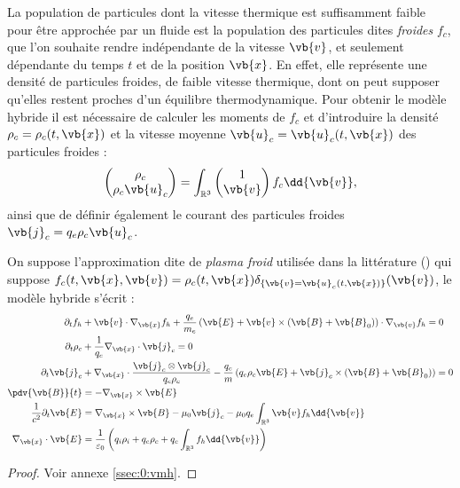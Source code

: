 La population de particules dont la vitesse thermique est suffisamment faible pour être approchée par un fluide est la population des particules dites \emph{froides} $f_c$, que l'on souhaite rendre indépendante de la vitesse $\vb{v}$, et seulement dépendante du temps $t$ et de la position $\vb{x}$. En effet, elle représente une densité de particules froides, de faible vitesse thermique, dont on peut supposer qu'elles restent proches d'un équilibre thermodynamique. Pour obtenir le modèle hybride il est nécessaire de calculer les moments de $f_c$ et d'introduire la densité $\rho_c=\rho_c(t,\vb{x})$ et la vitesse moyenne $\vb{u}_c=\vb{u}_c(t,\vb{x})$ des particules froides :
$$
  \begin{pmatrix}
    \rho_c \\
    \rho_c \vb{u}_c
  \end{pmatrix}
  =
  \int_{\mathbb{R}^3} \begin{pmatrix}
    1 \\
    \vb{v}
  \end{pmatrix} f_c\dd{\vb{v}},
$$
ainsi que de définir également le courant des particules froides $\vb{j}_c = q_e\rho_c\vb{u}_c$.

\begin{pro}
  \label{pro:0:vmh}
  On suppose l'approximation dite de \emph{plasma froid} utilisée dans la littérature (\cite{Tronci:2014,Holderied:2019}) qui suppose $f_c(t,\vb{x},\vb{v}) = \rho_c(t,\vb{x})\delta_{\{\vb{v}=\vb{u}_c(t,\vb{x})\}}(\vb{v})$, le modèle hybride s'écrit :
  \begin{align}
    \label{eq:0:vmh:1}
      \partial_t f_h &+ \vb{v}\cdot\nabla_{\vb{x}} f_h + \frac{q_e}{m_e}\left( \vb{E} + \vb{v}\times(\vb{B}+\vb{B}_0) \right)\cdot\nabla_{\vb{v}} f_h = 0 \\
    \label{eq:0:vmh:2}
      \partial_t\rho_c &+ \frac{1}{q_e}\nabla_{\vb{x}}\cdot\vb{j}_c = 0 \\
    \label{eq:0:vmh:3}
      \partial_t\vb{j}_c &+ \nabla_{\vb{x}}\cdot\frac{\vb{j}_c\otimes\vb{j}_c}{q_e\rho_c} - \frac{q_e}{m}\left( q_e\rho_c\vb{E} + \vb{j}_c\times(\vb{B}+\vb{B}_0) \right) = 0 \\
    \label{eq:0:vmh:4}
      \pdv{\vb{B}}{t} &= - \nabla_{\vb{x}}\times\vb{E} \\
    \label{eq:0:vmh:5}
      \frac{1}{c^2}\partial_t\vb{E} &= \nabla_{\vb{x}}\times \vb{B} - \mu_0\vb{j}_c - \mu_0 q_e\int_{\mathbb{R}^3} \vb{v} f_h\dd{\vb{v}} \\
    \label{eq:0:vmh:6}
      \nabla_{\vb{x}}\cdot\vb{E} &= \frac{1}{\varepsilon_0}\left( q_i\rho_i + q_e\rho_c + q_e\int_{\mathbb{R}^3} f_h\dd{\vb{v}} \right)
  \end{align}
\end{pro}
\begin{proof}
  Voir annexe \ref{ssec:0:vmh}.
\end{proof}

